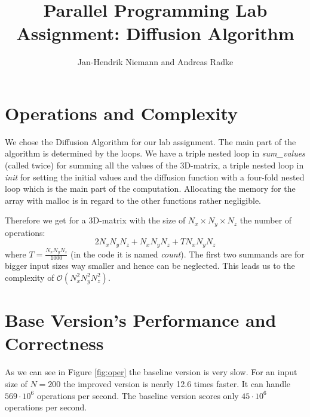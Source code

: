 \documentclass[12pt,a4paper]{article}
\author{Jan-Hendrik Niemann and Andreas Radke}
\title{Parallel Programming Lab Assignment: Diffusion Algorithm}
\begin{document}
	\maketitle
	
\section{Operations and Complexity}\label{chp:opcom}

We chose the Diffusion Algorithm for our lab assignment.
The main part of the algorithm is determined by the loops. We have a triple nested loop in \emph{sum\_values} (called twice) for summing all the values of the 3D-matrix, a triple nested loop in \emph{init} for setting the initial values and the diffusion function with a four-fold nested loop which is the main part of the computation. Allocating the memory for the array with malloc is in regard to the other functions rather negligible. 

Therefore we get for a 3D-matrix with the size of $ N_x\times N_y \times N_z $ the number of operations: \[ 2 N_x N_y N_z + N_x N_y N_z + T N_x N_y N_z \]
where $ T =  \frac{N_x N_y N_z}{1000}$ (in the code it is named \emph{count}).
The first two summands are for bigger input sizes way smaller and hence can be neglected. This leads us to the complexity of $ \mathcal{O}(N_x^2 N_y^2 N_z^2) $.

\section{Base Version's Performance and Correctness}

As we can see in Figure \ref{fig:oper} the baseline version is very slow. For an input size of $N=200$ the improved version is nearly 12.6 times faster. It can handle $569\cdot10^6$ operations per second. The baseline version scores only $45\cdot10^6$ operations per second.
\end{document}
